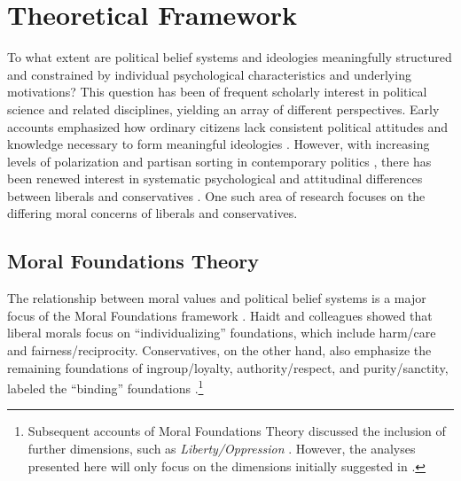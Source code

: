 \documentclass[12pt]{article}
\begin{document}
%
%

\section{Theoretical Framework}

To what extent are political belief systems and ideologies meaningfully structured and constrained by individual psychological characteristics and underlying motivations? This question has been of frequent scholarly interest in political science and related disciplines, yielding an array of different perspectives. Early accounts emphasized how ordinary citizens lack consistent political attitudes and knowledge necessary to form meaningful ideologies \citep[e.g.][]{converse1964nature}. However, with increasing levels of polarization and partisan sorting in contemporary politics \citep{iyengar2015fear}, there has been renewed interest in systematic psychological and attitudinal differences between liberals and conservatives \citep{jost2006end}. One such area of research focuses on the differing moral concerns of liberals and conservatives.


\subsection{Moral Foundations Theory}

The relationship between moral values and political belief systems is a major focus of the Moral Foundations framework \citep[c.f.][]{haidt2012righteous}. Haidt and colleagues showed that liberal morals focus on ``individualizing'' foundations, which include harm/care and fairness/reciprocity. Conservatives, on the other hand, also emphasize the remaining foundations of ingroup/loyalty, authority/respect, and purity/sanctity, labeled the ``binding'' foundations \citep{haidt2007morality,graham2009liberals}.\footnote{Subsequent accounts of Moral Foundations Theory discussed the inclusion of further dimensions, such as \textit{Liberty/Oppression} \citep[c.f.][]{graham2013moral,haidt2012righteous}. However, the analyses presented here will only focus on the dimensions initially suggested in \citet{haidt2008moral}.}
\end{document}
